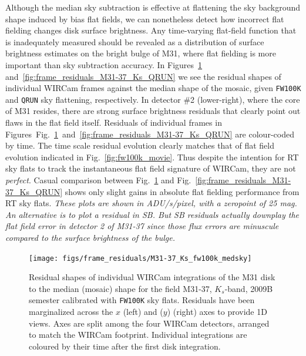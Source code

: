 \documentclass[iop]{emulateapj}
\newcommand{\comment}[1]{\textcolor{OliveGreen}{\textit{#1}}} %
\newcommand{\Fig}[1]{Fig.~\ref{fig:#1}}  %
\begin{document}
Although the median sky subtraction is effective at flattening the sky background shape induced by bias flat fields, we can nonetheless detect how incorrect flat fielding changes disk surface brightness.
Any time-varying flat-field function that is inadequately measured should be revealed as a distribution of surface brightness estimates on the bright bulge of M31, where flat fielding is more important than sky subtraction accuracy.
In Figures~\ref{fig:frame_residuals_M31-37_Ks_fw100k_medsky} and~\ref{fig:frame_residuals_M31-37_Ks_QRUN} we see the residual shapes of individual WIRCam frames against the median shape of the mosaic, given \texttt{FW100K} and \texttt{QRUN} sky flattening, respectively.
In detector \#2 (lower-right), where the core of M31 resides, there are strong surface brightness residuals that clearly point out flaws in the flat field itself.
Residuals of individual frames in Figures~\Fig{frame_residuals_M31-37_Ks_fw100k_medsky}~and~\ref{fig:frame_residuals_M31-37_Ks_QRUN} are colour-coded by time.
The time scale residual evolution clearly matches that of flat field evolution indicated in \Fig{fw100k_movie}.
Thus despite the intention for RT sky flats to track the instantaneous flat field signature of WIRCam, they are not \emph{perfect}.
Casual comparison between \Fig{frame_residuals_M31-37_Ks_fw100k_medsky} and \Fig{frame_residuals_M31-37_Ks_QRUN} shows only slight gains in absolute flat fielding performance from RT sky flats.
\comment{These plots are shown in ADU/s/pixel, with a zeropoint of 25 mag. An alternative is to plot a residual in SB. But SB residuals actually downplay the flat field error in detector 2 of M31-37 since those flux errors are minuscule compared to the surface brightness of the bulge.}

\begin{figure}[p]
\centering
\texttt{[image: figs/frame\_residuals/M31-37\_Ks\_fw100k\_medsky]}
\caption{Residual shapes of individual WIRCam integrations of the M31 disk to the median (mosaic) shape for the field M31-37, $K_s$-band, 2009B semester calibrated with \texttt{FW100K} sky flats.
Residuals have been marginalized across the $x$ (left) and ($y$) (right) axes to provide 1D views.
Axes are split among the four WIRCam detectors, arranged to match the WIRCam footprint.
Individual integrations are coloured by their time after the first disk integration.}
\label{fig:frame_residuals_M31-37_Ks_fw100k_medsky}
\end{figure}
\end{document}
